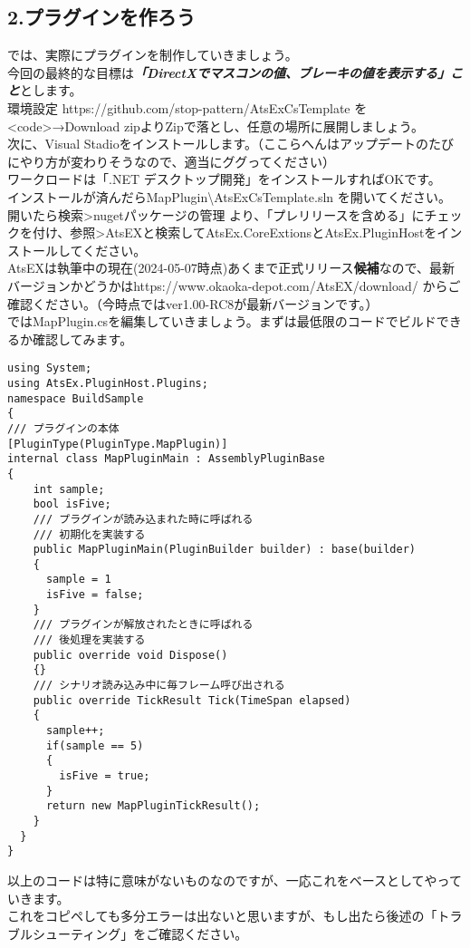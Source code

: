 \documentclass[b5paper,9pt,platex,dvipdfmx]{jsarticle}
\begin{document}
\begin{multicols*}{3}
\part*{2.プラグインを作ろう}
では、実際にプラグインを制作していきましょう。\\
今回の最終的な目標は\textbf\textit{「DirectXでマスコンの値、ブレーキの値を表示する」こと}とします。\\
{\large 環境設定}
https://github.com/stop-pattern/AtsExCsTemplate を<code>→Download zipよりZipで落とし、任意の場所に展開しましょう。\\
次に、Visual Stadioをインストールします。（ここらへんはアップデートのたびにやり方が変わりそうなので、適当にググってください）\\
ワークロードは「.NET デスクトップ開発」をインストールすればOKです。\\
インストールが済んだらMapPlugin\textbackslash AtsExCsTemplate.sln を開いてください。\\
開いたら検索>nugetパッケージの管理 より、「プレリリースを含める」にチェックを付け、参照>AtsEXと検索してAtsEx.CoreExtionsとAtsEx.PluginHostをインストールしてください。\\
AtsEXは執筆中の現在(2024-05-07時点)あくまで正式リリース\textbf{候補}なので、最新バージョンかどうかはhttps://www.okaoka-depot.com/AtsEX/download/ からご確認ください。（今時点ではver1.00-RC8が最新バージョンです。）\\
ではMapPlugin.csを編集していきましょう。まずは最低限のコードでビルドできるか確認してみます。
\begin{lstlisting}[caption=MapPlugin.cs]
using System;
using AtsEx.PluginHost.Plugins;
namespace BuildSample
{
/// プラグインの本体
[PluginType(PluginType.MapPlugin)]
internal class MapPluginMain : AssemblyPluginBase
{
    int sample;
    bool isFive;
    /// プラグインが読み込まれた時に呼ばれる
    /// 初期化を実装する
    public MapPluginMain(PluginBuilder builder) : base(builder)
    {
      sample = 1
      isFive = false;
    }
    /// プラグインが解放されたときに呼ばれる
    /// 後処理を実装する
    public override void Dispose()
    {}
    /// シナリオ読み込み中に毎フレーム呼び出される
    public override TickResult Tick(TimeSpan elapsed)
    {
      sample++;
      if(sample == 5)
      {
        isFive = true;
      }
      return new MapPluginTickResult();
    }
  }
}
\end{lstlisting}
以上のコードは特に意味がないものなのですが、一応これをベースとしてやっていきます。\\
これをコピペしても多分エラーは出ないと思いますが、もし出たら後述の「トラブルシューティング」をご確認ください。\\

\end{multicols*}
\end{document}
